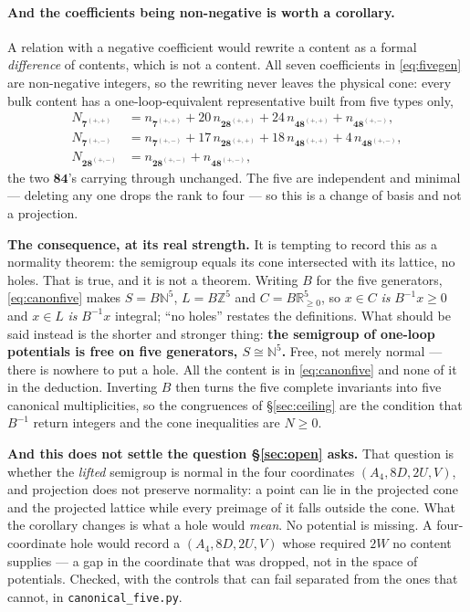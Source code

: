 \documentclass[11pt,a4paper]{article}
\newcommand{\ZZ}{\mathbb{Z}}
\newcommand{\NN}{\mathbb{N}}
\newcommand{\RR}{\mathbb{R}}
\newcommand{\rep}[1]{\mathbf{#1}}
\begin{document}
\paragraph{And the coefficients being non-negative is worth a corollary.} A relation with a
negative coefficient would rewrite a content as a formal \emph{difference} of contents, which is
not a content. All seven coefficients in \eqref{eq:fivegen} are non-negative integers, so the
rewriting never leaves the physical cone: every bulk content has a one-loop-equivalent
representative built from five types only,
\begin{equation}\label{eq:canonfive}
\begin{aligned}
  N_{\rep7^{(+,+)}}&=n_{\rep7^{(+,+)}}+20\,n_{\rep{28}^{(+,+)}}+24\,n_{\rep{48}^{(+,+)}}+n_{\rep{48}^{(+,-)}},\\
  N_{\rep7^{(+,-)}}&=n_{\rep7^{(+,-)}}+17\,n_{\rep{28}^{(+,+)}}+18\,n_{\rep{48}^{(+,+)}}+4\,n_{\rep{48}^{(+,-)}},\\
  N_{\rep{28}^{(+,-)}}&=n_{\rep{28}^{(+,-)}}+n_{\rep{48}^{(+,-)}},
\end{aligned}
\end{equation}
the two $\rep{84}$'s carrying through unchanged. The five are independent and minimal --- deleting
any one drops the rank to four --- so this is a change of basis and not a projection.

\noindent\textbf{The consequence, at its real strength.} It is tempting to record this as a
normality theorem: the semigroup equals its cone intersected with its lattice, no holes. That is
true, and it is not a theorem. Writing $B$ for the five generators, \eqref{eq:canonfive} makes
$S=B\NN^5$, $L=B\ZZ^5$ and $C=B\RR_{\ge0}^5$, so $x\in C$ \emph{is} $B^{-1}x\ge0$ and $x\in L$
\emph{is} $B^{-1}x$ integral; ``no holes'' restates the definitions. What should be said instead
is the shorter and stronger thing: \textbf{the semigroup of one-loop potentials is free on five
generators, $S\cong\NN^5$.} Free, not merely normal --- there is nowhere to put a hole. All the
content is in \eqref{eq:canonfive} and none of it in the deduction. Inverting $B$ then turns the
five complete invariants into five canonical multiplicities, so the congruences of
\S\ref{sec:ceiling} are the condition that $B^{-1}$ return integers and the cone inequalities are
$N\ge0$.

\noindent\textbf{And this does not settle the question \S\ref{sec:open} asks.} That question is
whether the \emph{lifted} semigroup is normal in the four coordinates $(A_4,8D,2U,V)$, and
projection does not preserve normality: a point can lie in the projected cone and the projected
lattice while every preimage of it falls outside the cone. What the corollary changes is what a
hole would \emph{mean}. No potential is missing. A four-coordinate hole would record a
$(A_4,8D,2U,V)$ whose required $2W$ no content supplies --- a gap in the coordinate that was
dropped, not in the space of potentials. Checked, with the controls that can fail separated from
the ones that cannot, in \texttt{canonical\_\allowbreak five.py}.
\end{document}
